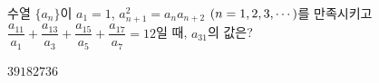 \hspace*{2mm}\begin{minipage}[t]{\dimexpr\linewidth-2mm\relax}\vspace{0pt}
수열 $\{a_n\}$이 $a_1=1$, $a_{n+1}^2=a_na_{n+2}$ $(n=1{,}\mkern3mu\mathopen{}2{,}\mkern3mu\mathopen{}3{,}\mkern3mu\mathopen{}\cdots)$를 만족시키고 $\dfrac{a_{11}}{a_1}+\dfrac{a_{13}}{a_3}+\dfrac{a_{15}}{a_5}+\dfrac{a_{17}}{a_7}=12$일 때, $a_{31}$의 값은?
\begin{choices32}{$3$}{$9$}{$18$}{$27$}{$36$}\end{choices32}\end{minipage}
